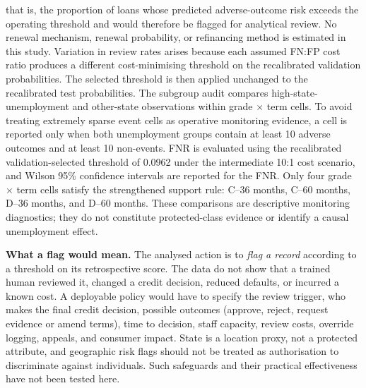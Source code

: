 \documentclass[10pt]{article}
\begin{document}
that is, the proportion of loans whose predicted adverse-outcome risk exceeds the operating threshold and would therefore be flagged for analytical review. No renewal mechanism, renewal probability, or refinancing method is estimated in this study. Variation in review rates arises because each assumed FN:FP cost ratio produces a different cost-minimising threshold on the recalibrated validation probabilities. The selected threshold is then applied unchanged to the recalibrated test probabilities. The subgroup audit compares high-state-unemployment and other-state observations within grade $\times$ term cells. To avoid treating extremely sparse event cells as operative monitoring evidence, a cell is reported only when both unemployment groups contain at least 10 adverse outcomes and at least 10 non-events. FNR is evaluated using the recalibrated validation-selected threshold of 0.0962 under the intermediate 10:1 cost scenario, and Wilson 95\% confidence intervals are reported for the FNR. Only four grade $\times$ term cells satisfy the strengthened support rule: C--36 months, C--60 months, D--36 months, and D--60 months. These comparisons are descriptive monitoring diagnostics; they do not constitute protected-class evidence or identify a causal unemployment effect.

\noindent\textbf{What a flag would mean.} The analysed action is to \emph{flag a record} according to a threshold on its retrospective score. The data do not show that a trained human reviewed it, changed a credit decision, reduced defaults, or incurred a known cost. A deployable policy would have to specify the review trigger, who makes the final credit decision, possible outcomes (approve, reject, request evidence or amend terms), time to decision, staff capacity, review costs, override logging, appeals, and consumer impact. State is a location proxy, not a protected attribute, and geographic risk flags should not be treated as authorisation to discriminate against individuals. Such safeguards and their practical effectiveness have not been tested here.
\end{document}
